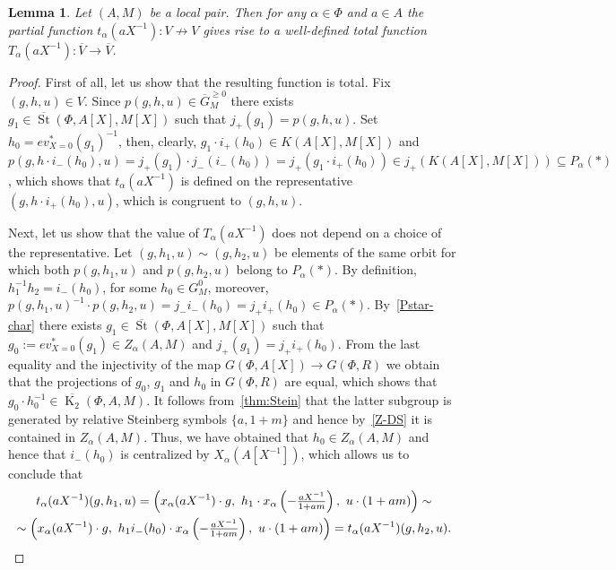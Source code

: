 \documentclass[oneside, 8pt]{amsart}
\newtheorem{lemma}{Lemma}
\theoremstyle{remark}
\theoremstyle{definition}
\numberwithin{lemma}{section}
\numberwithin{prop}{section}
\numberwithin{corollary}{section}
\numberwithin{externaltheorem}{section}
\DeclareMathOperator{\St}{St}
\DeclareMathOperator{\K}{K}
\numberwithin{equation}{section}
\begin{document}
\begin{lemma}\label{lem:orbit-action} Let $(A, M)$ be a local pair. 
Then for any $\alpha \in \Phi$ and $a \in A$ the partial function $t_\alpha(aX^{-1}) \colon V \not \to V$ gives rise to a well-defined total function $T_\alpha(aX^{-1}) \colon \overline{V} \to \overline{V}$. \end{lemma}
\begin{proof}
 First of all, let us show that the resulting function is total. 
 Fix $(g, h, u) \in V$. Since $p(g, h, u) \in \overline{G}^{\geq 0}_M$ there exists $g_1 \in \overline{\St}(\Phi, A[X], M[X])$ such that $j_+(g_1) = p(g, h, u).$
 Set $h_0 = ev^*_{X=0}(g_1)^{-1}$, then, clearly, $g_1 \cdot i_+(h_0) \in K(A[X], M[X])$ and 
 $p(g, h \cdot i_-(h_0), u) = j_+(g_1) \cdot j_-(i_-(h_0)) = j_+(g_1 \cdot i_+(h_0)) \in j_+(K(A[X], M[X])) \subseteq P_\alpha(*)$, which shows that $t_\alpha(aX^{-1})$ is defined on the representative $(g, h \cdot i_+(h_0), u)$, which is congruent to $(g, h, u)$.
  
 Next, let us show that the value of $T_\alpha(aX^{-1})$ does not depend on a choice of the representative.
 Let $(g, h_1, u) \sim (g, h_2, u)$ be elements of the same orbit for which both $p(g, h_1, u)$ and $p(g, h_2, u)$ belong to $P_\alpha(*)$.
 By definition, $h_1^{-1} h_2 = i_-(h_0)$, for some $h_0 \in G^0_M$, moreover, 
  $p(g, h_1, u)^{-1} \cdot p(g, h_2, u) = j_- i_-(h_0) = j_+ i_+(h_0) \in P_\alpha(*)$.
 By~\cref{Pstar-char} there exists $g_1 \in \overline{\St}(\Phi, A[X], M[X])$ such that $g_0 := ev^*_{X=0}(g_1) \in Z_\alpha(A, M)$ and $j_+(g_1) = j_+ i_+ (h_0)$.
 From the last equality and the injectivity of the map $G(\Phi, A[X]) \to G(\Phi, R)$ we obtain that the projections of $g_0$, $g_1$ and $h_0$ in $G(\Phi, R)$ are equal, which shows that $g_0 \cdot h_0^{-1} \in \overline{\K_2}(\Phi, A, M)$. It follows from~\cref{thm:Stein} that the latter subgroup is generated by relative Steinberg symbols $\{ a, 1 + m \}$ and hence by~\cref{Z-DS} it is contained in $Z_\alpha(A, M)$. Thus, we have obtained that $h_0 \in Z_\alpha(A, M)$ and hence that $i_-(h_0)$ is centralized by $X_\alpha(A[X^{-1}])$, which allows us to conclude that
 \begin{multline} \nonumber
  t_\alpha(aX^{-1})(g, h_1, u) = \left( x_\alpha(aX^{-1})\cdot g ,\ h_1 \cdot x_\alpha\left(-\tfrac{aX^{-1}}{1 + am}\right),\ u \cdot (1 + am)\right) \sim \\
  \sim \left( x_\alpha(aX^{-1})\cdot g ,\ h_1 i_-(h_0) \cdot x_\alpha\left(-\tfrac{aX^{-1}}{1 + am}\right),\ u \cdot (1 + am)\right) = t_\alpha(aX^{-1})(g, h_2, u). \qedhere
 \end{multline} \end{proof}
\end{document}
